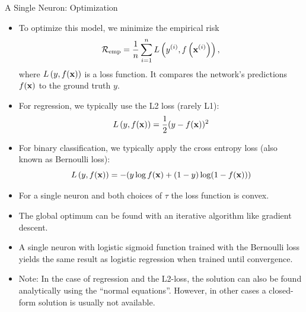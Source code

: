 \begin{vbframe} {A Single Neuron: Optimization}
\begin{itemize}
\item To optimize this model, we minimize the empirical risk 
$$\mathcal{R}_{\text{emp}} = \frac{1}{n} \sum\limits_{i=1}^n L\left(y^{(i)}, f\left(\mathbf{x}^{(i)}\right)\right),$$
where $L\left(y, f(\mathbf{x})\right)$ is a loss function. It compares the network's predictions $f(\mathbf{x})$ to the ground truth $y$. 
\item For regression, we typically use the L2 loss (rarely L1): $$L\left(y, f(\mathbf{x})\right) = \frac{1}{2}(y - f(\mathbf{x}))^2$$
\item For binary classification, we typically apply the cross entropy loss (also known as Bernoulli loss): $$L\left(y, f(\mathbf{x})\right) = -(y \log f(\mathbf{x}) + (1 - y) \log(1 - f(\mathbf{x})))$$
\framebreak 

\vspace{.5cm}
\item For a single neuron and both choices of $\tau$ the loss function is convex.
\item The global optimum can be found with an iterative algorithm like gradient descent. 
\item A single neuron with logistic sigmoid function trained with the Bernoulli loss %
 yields the %
 same result as logistic regression when trained until convergence.
\item Note: In the case of regression and the L2-loss, the solution can
also be found analytically using the “normal equations”. However, in other cases a closed-form solution is usually not available.
\end{itemize}
\end{vbframe} 

\endlecture
